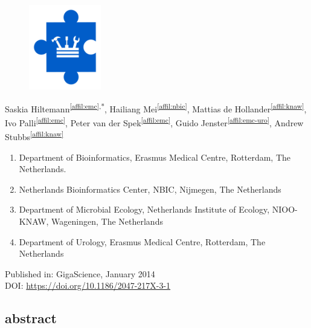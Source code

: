 \setcounter{NAT@ctr}{-1}
\chapter*{}

\begin{figure}[t!]
\centering
\includegraphics[height=10em]{frontmatter/images/chapter-header-tools.png}
\end{figure}
\vspace{-4cm}

Saskia Hiltemann\textsuperscript{\ref{affil:emc},*},
Hailiang Mei\textsuperscript{\ref{affil:nbic}},
Mattias de Hollander\textsuperscript{\ref{affil:knaw}},
Ivo Palli\textsuperscript{\ref{affil:emc}},
Peter van der Spek\textsuperscript{\ref{affil:emc}},
Guido Jenster\textsuperscript{\ref{affil:emc-uro}},
Andrew Stubbs\textsuperscript{\ref{affil:knaw}}

\small
\begin{enumerate}
\itemsep-0.5em
\item Department of Bioinformatics, Erasmus Medical Centre, Rotterdam, The Netherlands.\label{affil:emc}
\item Netherlands Bioinformatics Center, NBIC, Nijmegen, The Netherlands\label{affil:nbic}
\item Department of Microbial Ecology, Netherlands Institute of Ecology, NIOO-KNAW, Wageningen, The Netherlands\label{affil:knaw}
\item Department of Urology, Erasmus Medical Centre, Rotterdam,  The Netherlands\label{affil:emc-uro}
\end{enumerate}
\normalsize

Published in: GigaScience, January 2014 \\
DOI: \url{https://doi.org/10.1186/2047-217X-3-1}

\section*{abstract}

